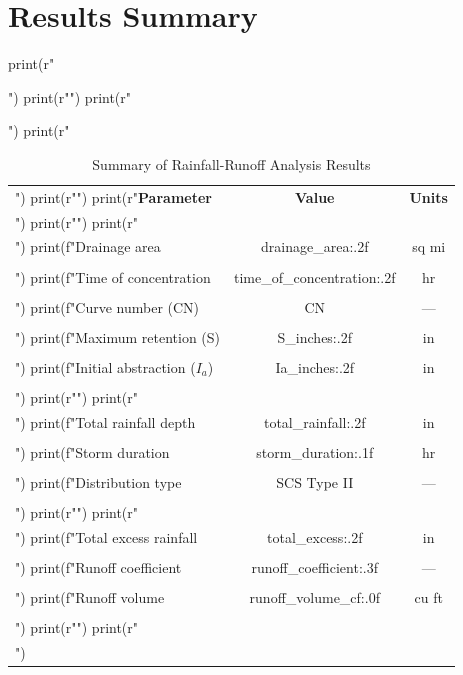 \documentclass[a4paper, 11pt]{article}
\begin{document}
\section{Results Summary}

\begin{pycode}
print(r"\begin{table}[htbp]")
print(r"\centering")
print(r"\caption{Summary of Rainfall-Runoff Analysis Results}")
print(r"\begin{tabular}{lcc}")
print(r"\toprule")
print(r"\textbf{Parameter} & \textbf{Value} & \textbf{Units} \\")
print(r"\midrule")
print(r"\multicolumn{3}{l}{\textit{Watershed Characteristics}} \\")
print(f"Drainage area & {drainage_area:.2f} & sq mi \\\\")
print(f"Time of concentration & {time_of_concentration:.2f} & hr \\\\")
print(f"Curve number (CN) & {CN} & --- \\\\")
print(f"Maximum retention (S) & {S_inches:.2f} & in \\\\")
print(f"Initial abstraction ($I_a$) & {Ia_inches:.2f} & in \\\\")
print(r"\midrule")
print(r"\multicolumn{3}{l}{\textit{Design Storm}} \\")
print(f"Total rainfall depth & {total_rainfall:.2f} & in \\\\")
print(f"Storm duration & {storm_duration:.1f} & hr \\\\")
print(f"Distribution type & SCS Type II & --- \\\\")
print(r"\midrule")
print(r"\multicolumn{3}{l}{\textit{Runoff Generation}} \\")
print(f"Total excess rainfall & {total_excess:.2f} & in \\\\")
print(f"Runoff coefficient & {runoff_coefficient:.3f} & --- \\\\")
print(f"Runoff volume & {runoff_volume_cf:.0f} & cu ft \\\\")
print(r"\midrule")
print(r"\multicolumn{3}{l}{\textit{Unit Hydrograph}} \\")

\end{tabular}
\end{table}
\end{pycode}
\end{document}

